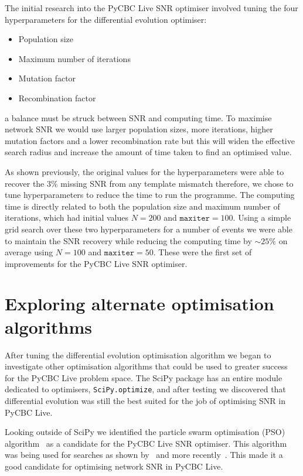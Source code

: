 The initial research into the PyCBC Live SNR optimiser involved tuning the four hyperparameters for the differential evolution optimiser:
%
\begin{itemize}
    \item Population size
    \item Maximum number of iterations
    \item Mutation factor
    \item Recombination factor
\end{itemize}
%
a balance must be struck between SNR and computing time. To maximise network SNR we would use larger population sizes, more iterations, higher mutation factors and a lower recombination rate but this will widen the effective search radius and increase the amount of time taken to find an optimised value.

As shown previously, the original values for the hyperparameters were able to recover the $3\%$ missing SNR from any template mismatch therefore, we chose to tune hyperparameters to reduce the time to run the programme. The computing time is directly related to both the population size and maximum number of iterations, which had initial values $N = 200$ and $\texttt{maxiter} = 100$. Using a simple grid search over these two hyperparameters for a number of events we were able to maintain the SNR recovery while reducing the computing time by ${\sim}25\%$ on average using $N = 100$ and $\texttt{maxiter} = 50$. These were the first set of improvements for the PyCBC Live SNR optimiser.




\section{\label{7:sec:exploring_alt_opts}Exploring alternate optimisation algorithms}

After tuning the differential evolution optimisation algorithm we began to investigate other optimisation algorithms that could be used to greater success for the PyCBC Live problem space. The SciPy package has an entire module dedicated to optimisers, \texttt{SciPy.optimize}, and after testing we discovered that differential evolution was still the best suited for the job of optimising SNR in PyCBC Live.

Looking outside of SciPy we identified the particle swarm optimisation (PSO) algorithm~\cite{pso:1995} as a candidate for the PyCBC Live SNR optimiser. This algorithm was being used for \gwadj searches as shown by~\cite{pso_search_1:2018} and more recently~\cite{pso_search_2:2023}. This made it a good candidate for optimising network SNR in PyCBC Live.



